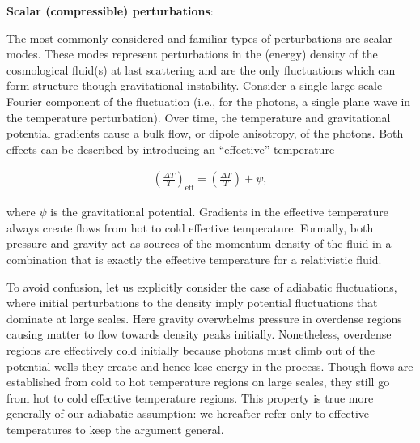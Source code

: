 \documentclass[a4paper,11pt]{article}
\begin{document}
{\noindent}\textbf{Scalar (compressible) perturbations}:

{\noindent}The most commonly considered and familiar types of perturbations are scalar modes. These modes represent perturbations in the (energy) density of the cosmological fluid(s) at last scattering and are the only fluctuations which can form structure though gravitational instability. Consider a single large-scale Fourier component of the fluctuation (i.e., for the photons, a single plane wave in the temperature perturbation). Over time, the temperature and gravitational potential gradients cause a bulk flow, or dipole anisotropy, of the photons. Both effects can be described by introducing an “effective” temperature

\begin{align*}
    \left(\frac{\Delta T}{T}\right)_\mathrm{eff} = \left(\frac{\Delta T}{T}\right) + \psi,
\end{align*}

{\noindent}where $\psi$ is the gravitational potential. Gradients in the effective temperature always create flows from hot to cold effective temperature. Formally, both pressure and gravity act as sources of the momentum density of the fluid in a combination that is exactly the effective temperature for a relativistic fluid.

{\noindent} To avoid confusion, let us explicitly consider the case of adiabatic fluctuations, where initial perturbations to the density imply potential fluctuations that dominate at large scales. Here gravity overwhelms pressure in overdense regions causing matter to flow towards density peaks initially. Nonetheless, overdense regions are effectively cold initially because photons must climb out of the potential wells they create and hence lose energy in the process. Though flows are established from cold to hot temperature regions on large scales, they still go from hot to cold effective temperature regions. This property is true more generally of our adiabatic assumption: we hereafter refer only to effective temperatures to keep the argument general.
\end{document}

